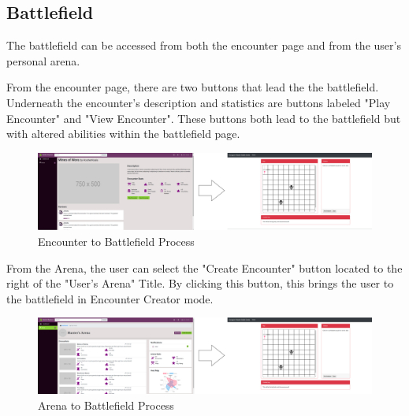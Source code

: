 \documentclass[12pt,a4paper]{report}
\begin{document}
		\subsection{Battlefield}
		The battlefield can be accessed from both the encounter page and from the user's personal arena. 
		
		From the encounter page, there are two buttons that lead the the battlefield. Underneath the encounter's description and statistics are buttons labeled "Play Encounter" and "View Encounter". These buttons both lead to the battlefield but with altered abilities within the battlefield page. 
		\begin{figure}[H]	
			\centering
			\centerline{\includegraphics[scale=.16]{battlefieldEncounterNav}}
			\caption{Encounter to Battlefield Process}
			\label{fig: Encounter to Battlefield}
		\end{figure}
		From the Arena, the user can select the "Create Encounter" button located to the right of the "User's Arena" Title. By clicking this button, this brings the user to the battlefield in Encounter Creator mode. 
		\begin{figure}[H]	
			\centering
			\centerline{\includegraphics[scale=.16]{battlefieldArenaNav}}
			\caption{Arena to Battlefield Process}
			\label{fig: Arena to Battlefield}
		\end{figure}
	\newpage
\end{document}
